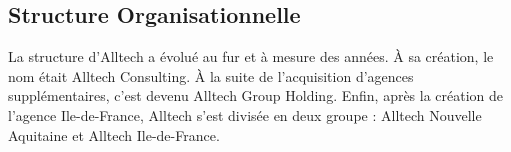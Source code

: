 \subsection{Structure Organisationnelle}

La structure d’Alltech a évolué au fur et à mesure des années. À sa création, le nom était Alltech Consulting. À la 
suite de l’acquisition d’agences supplémentaires, c’est devenu Alltech Group Holding. Enfin, après la création de 
l’agence Ile-de-France, Alltech s’est divisée en deux groupe : Alltech Nouvelle Aquitaine et Alltech Ile-de-France.